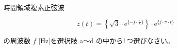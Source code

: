 時間領域複素正弦波

\[
z(t) =  \left \{ \sqrt{3} \cdot \textrm{e}^{\{ -j \cdot \frac{\pi}{8} \}} \right \} \cdot \textrm{e}^{\{ j \cdot \pi \cdot t \}}
\]

\bigskip
\noindent の周波数 $f$ [Hz]を選択肢 a〜d の中から1つ選びなさい。
